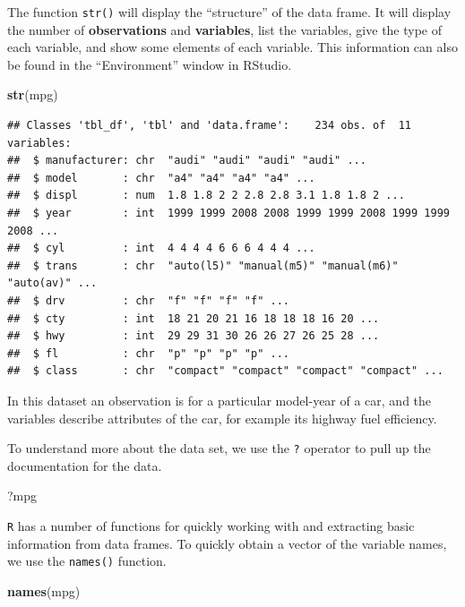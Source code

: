 \documentclass[]{book}
\newenvironment{Shaded}{\begin{snugshade}}{\end{snugshade}}
\newcommand{\KeywordTok}[1]{\textcolor[rgb]{0.13,0.29,0.53}{\textbf{#1}}}
\newcommand{\NormalTok}[1]{#1}
\theoremstyle{definition}
\theoremstyle{definition}
\theoremstyle{definition}
\theoremstyle{remark}
\begin{document}
The function \texttt{str()} will display the ``structure'' of the data
frame. It will display the number of \textbf{observations} and
\textbf{variables}, list the variables, give the type of each variable,
and show some elements of each variable. This information can also be
found in the ``Environment'' window in RStudio.

\begin{Shaded}
\begin{Highlighting}[]
\KeywordTok{str}\NormalTok{(mpg)}
\end{Highlighting}
\end{Shaded}

\begin{verbatim}
## Classes 'tbl_df', 'tbl' and 'data.frame':    234 obs. of  11 variables:
##  $ manufacturer: chr  "audi" "audi" "audi" "audi" ...
##  $ model       : chr  "a4" "a4" "a4" "a4" ...
##  $ displ       : num  1.8 1.8 2 2 2.8 2.8 3.1 1.8 1.8 2 ...
##  $ year        : int  1999 1999 2008 2008 1999 1999 2008 1999 1999 2008 ...
##  $ cyl         : int  4 4 4 4 6 6 6 4 4 4 ...
##  $ trans       : chr  "auto(l5)" "manual(m5)" "manual(m6)" "auto(av)" ...
##  $ drv         : chr  "f" "f" "f" "f" ...
##  $ cty         : int  18 21 20 21 16 18 18 18 16 20 ...
##  $ hwy         : int  29 29 31 30 26 26 27 26 25 28 ...
##  $ fl          : chr  "p" "p" "p" "p" ...
##  $ class       : chr  "compact" "compact" "compact" "compact" ...
\end{verbatim}

In this dataset an observation is for a particular model-year of a car,
and the variables describe attributes of the car, for example its
highway fuel efficiency.

To understand more about the data set, we use the \texttt{?} operator to
pull up the documentation for the data.

\begin{Shaded}
\begin{Highlighting}[]
\NormalTok{?mpg}
\end{Highlighting}
\end{Shaded}

\texttt{R} has a number of functions for quickly working with and
extracting basic information from data frames. To quickly obtain a
vector of the variable names, we use the \texttt{names()} function.

\begin{Shaded}
\begin{Highlighting}[]
\KeywordTok{names}\NormalTok{(mpg)}
\end{Highlighting}
\end{Shaded}
\end{document}
